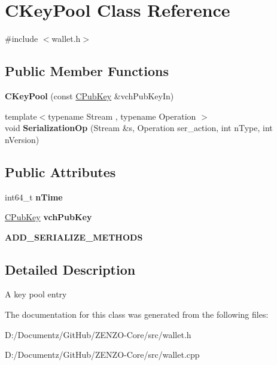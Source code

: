\hypertarget{class_c_key_pool}{}\section{C\+Key\+Pool Class Reference}
\label{class_c_key_pool}


{\ttfamily \#include $<$wallet.\+h$>$}

\subsection*{Public Member Functions}
\begin{DoxyCompactItemize}
\item 
\mbox{\label{class_c_key_pool_a63e27cd41ea374cc909436b3083b68c4}} 
{\bfseries C\+Key\+Pool} (const \mbox{\hyperlink{class_c_pub_key}{C\+Pub\+Key}} \&vch\+Pub\+Key\+In)
\item 
\mbox{\label{class_c_key_pool_a2589572f0eb90da9237684a16484c03d}} 
{\footnotesize template$<$typename Stream , typename Operation $>$ }\\void {\bfseries Serialization\+Op} (Stream \&s, Operation ser\+\_\+action, int n\+Type, int n\+Version)
\end{DoxyCompactItemize}
\subsection*{Public Attributes}
\begin{DoxyCompactItemize}
\item 
\mbox{\label{class_c_key_pool_aa2f8263f0baf732ad5b4e4b59b482209}} 
int64\+\_\+t {\bfseries n\+Time}
\item 
\mbox{\label{class_c_key_pool_a937080a4cec1f2b138ebd200557c82b5}} 
\mbox{\hyperlink{class_c_pub_key}{C\+Pub\+Key}} {\bfseries vch\+Pub\+Key}
\item 
\mbox{\label{class_c_key_pool_ad4bc93c36031a3e6306c102008be5f51}} 
{\bfseries A\+D\+D\+\_\+\+S\+E\+R\+I\+A\+L\+I\+Z\+E\+\_\+\+M\+E\+T\+H\+O\+DS}
\end{DoxyCompactItemize}


\subsection{Detailed Description}
A key pool entry 

The documentation for this class was generated from the following files\+:\begin{DoxyCompactItemize}
\item 
D\+:/\+Documentz/\+Git\+Hub/\+Z\+E\+N\+Z\+O-\/\+Core/src/wallet.\+h\item 
D\+:/\+Documentz/\+Git\+Hub/\+Z\+E\+N\+Z\+O-\/\+Core/src/wallet.\+cpp\end{DoxyCompactItemize}
